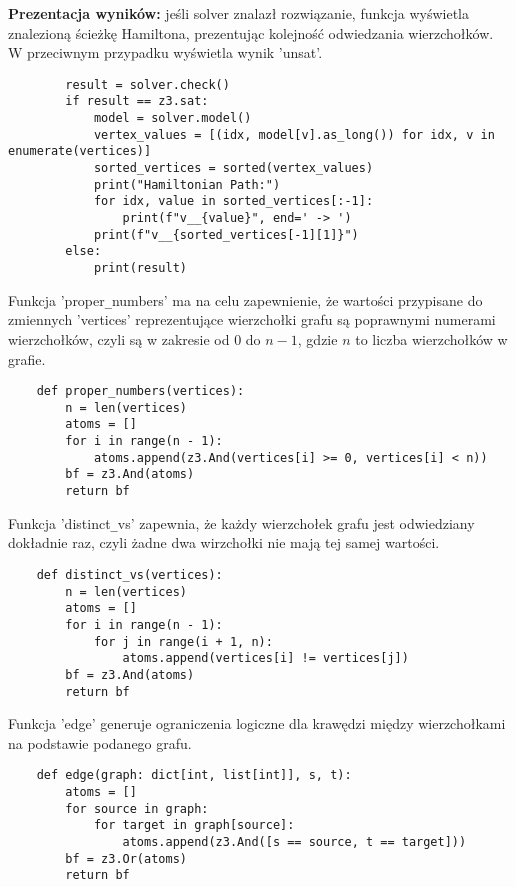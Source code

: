 \textbf{Prezentacja wyników: } jeśli solver znalazł rozwiązanie, funkcja wyświetla znalezioną ścieżkę Hamiltona, prezentując kolejność odwiedzania wierzchołków. W przeciwnym przypadku wyświetla wynik 'unsat'.

\begin{lstlisting}
		result = solver.check()
		if result == z3.sat:
			model = solver.model()
			vertex_values = [(idx, model[v].as_long()) for idx, v in enumerate(vertices)]
			sorted_vertices = sorted(vertex_values)
			print("Hamiltonian Path:")
			for idx, value in sorted_vertices[:-1]:
				print(f"v__{value}", end=' -> ')
			print(f"v__{sorted_vertices[-1][1]}")
		else:
			print(result)
\end{lstlisting}
\vspace{1cm}

Funkcja 'proper\verb|_|numbers' ma na celu zapewnienie, że wartości przypisane do zmiennych 'vertices' reprezentujące wierzchołki grafu są poprawnymi numerami wierzchołków, czyli są w zakresie od $0$ do $n - 1$, gdzie $n$ to liczba wierzchołków w grafie.

\begin{lstlisting}
	def proper_numbers(vertices):
		n = len(vertices)
		atoms = []
		for i in range(n - 1):
			atoms.append(z3.And(vertices[i] >= 0, vertices[i] < n))
		bf = z3.And(atoms)
		return bf
\end{lstlisting}
\vspace{1cm}

Funkcja 'distinct\verb|_|vs' zapewnia, że każdy wierzchołek grafu jest odwiedziany dokładnie raz, czyli żadne dwa wirzchołki nie mają tej samej wartości. 
		
\begin{lstlisting}	
	def distinct_vs(vertices):
		n = len(vertices)
		atoms = []
		for i in range(n - 1):
			for j in range(i + 1, n):
				atoms.append(vertices[i] != vertices[j])
		bf = z3.And(atoms)
		return bf
\end{lstlisting}
\vspace{1cm}

Funkcja 'edge' generuje ograniczenia logiczne dla krawędzi między wierzchołkami na podstawie podanego grafu.
	
\begin{lstlisting}	
	def edge(graph: dict[int, list[int]], s, t):
		atoms = []
		for source in graph:
			for target in graph[source]:
				atoms.append(z3.And([s == source, t == target]))
		bf = z3.Or(atoms)
		return bf
\end{lstlisting}

